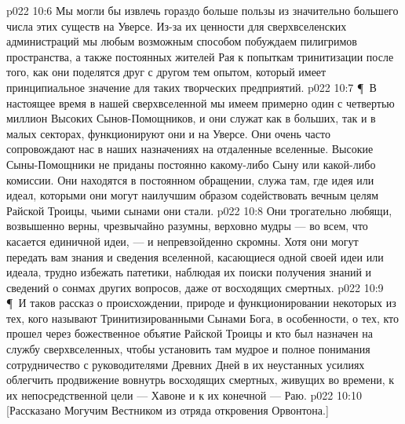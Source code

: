 \vs p022 10:6 Мы могли бы извлечь гораздо больше пользы из значительно большего числа этих существ на Уверсе. Из\hyp{}за их ценности для сверхвселенских администраций мы любым возможным способом побуждаем пилигримов пространства, а также постоянных жителей Рая к попыткам тринитизации после того, как они поделятся друг с другом тем опытом, который имеет принципиальное значение для таких творческих предприятий.
\vs p022 10:7 \P\ В настоящее время в нашей сверхвселенной мы имеем примерно один с четвертью миллион Высоких Сынов\hyp{}Помощников, и они служат как в больших, так и в малых секторах, функционируют они и на Уверсе. Они очень часто сопровождают нас в наших назначениях на отдаленные вселенные. Высокие Сыны\hyp{}Помощники не приданы постоянно какому\hyp{}либо Сыну или какой\hyp{}либо комиссии. Они находятся в постоянном обращении, служа там, где идея или идеал, которыми они  могут наилучшим образом содействовать вечным целям Райской Троицы, чьими сынами они стали.
\vs p022 10:8 Они трогательно любящи, возвышенно верны, чрезвычайно разумны, верховно мудры --- во всем, что касается единичной идеи, --- и непревзойденно скромны. Хотя они могут передать вам знания и сведения вселенной, касающиеся одной своей идеи или идеала, трудно избежать патетики, наблюдая их поиски получения знаний и сведений о сонмах других вопросов, даже от восходящих смертных.
\vs p022 10:9 \P\ И таков рассказ о происхождении, природе и функционировании некоторых из тех, кого называют Тринитизированными Сынами Бога, в особенности, о тех, кто прошел через божественное объятие Райской Троицы и кто был назначен на службу сверхвселенных, чтобы установить там мудрое и полное понимания сотрудничество с руководителями Древних Дней в их неустанных усилиях облегчить продвижение вовнутрь восходящих смертных, живущих во времени, к их непосредственной цели --- Хавоне и к их конечной --- Раю.
\vs p022 10:10 [Рассказано Могучим Вестником из отряда откровения Орвонтона.]
